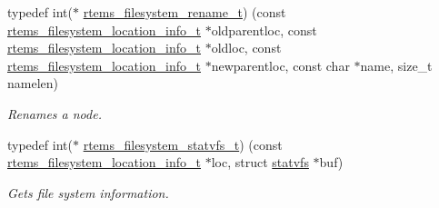 \begin{DoxyCompactItemize}
typedef int($\ast$ \mbox{\hyperlink{group__LibIOFSOps_ga6b92b1f0dc00c743d3fc99cebbeb22bf}{rtems\+\_\+filesystem\+\_\+rename\+\_\+t}}) (const \mbox{\hyperlink{group__LibIO_ga3252b3d31ee3c49ffff0b7604a676864}{rtems\+\_\+filesystem\+\_\+location\+\_\+info\+\_\+t}} $\ast$oldparentloc, const \mbox{\hyperlink{group__LibIO_ga3252b3d31ee3c49ffff0b7604a676864}{rtems\+\_\+filesystem\+\_\+location\+\_\+info\+\_\+t}} $\ast$oldloc, const \mbox{\hyperlink{group__LibIO_ga3252b3d31ee3c49ffff0b7604a676864}{rtems\+\_\+filesystem\+\_\+location\+\_\+info\+\_\+t}} $\ast$newparentloc, const char $\ast$name, size\+\_\+t namelen)
\begin{DoxyCompactList}\small\item\em Renames a node. \end{DoxyCompactList}\item 
typedef int($\ast$ \mbox{\hyperlink{group__LibIOFSOps_ga0866278bfe736fad7750e3e89c5fc93b}{rtems\+\_\+filesystem\+\_\+statvfs\+\_\+t}}) (const \mbox{\hyperlink{group__LibIO_ga3252b3d31ee3c49ffff0b7604a676864}{rtems\+\_\+filesystem\+\_\+location\+\_\+info\+\_\+t}} $\ast$loc, struct \mbox{\hyperlink{structstatvfs}{statvfs}} $\ast$buf)
\begin{DoxyCompactList}\small\item\em Gets file system information. \end{DoxyCompactList}\end{DoxyCompactItemize}
